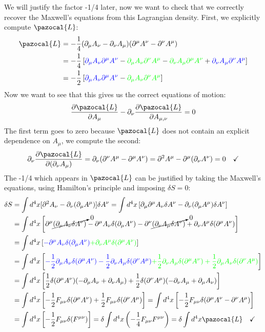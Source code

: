 \documentclass[../main.tex]{subfiles}
\begin{document}
We will justify the factor -1/4 later, now we want to check that we correctly recover the Maxwell's equations from this Lagrangian density. First, we explicitly compute $\pazocal{L}$:
\begin{align*}
\pazocal{L}&=-\frac{1}{4}(\partial_\mu A_\nu-\partial_\nu A_\mu)(\partial^\mu A^\nu-\partial^\nu A^\mu)\\
&=-\frac{1}{4}\left[{\color{blue}\partial_\mu A_\nu\partial^\mu A^\nu}-{\color{green}\partial_\mu A_\nu\partial^\nu A^\mu}-{\color{green}\partial_\nu A_\mu\partial^\mu A^\nu}+{\color{blue}\partial_\nu A_\mu\partial^\nu A^\mu}\right]\\
&=-\frac{1}{2}\left[{\color{blue}\partial_\mu A_\nu \partial^\mu A^\nu}-{\color{green}\partial_\mu A_\nu\partial^\nu A^\mu}\right]
\end{align*}
Now we want to see that this gives us the correct equations of motion:
\[
\frac{\partial\pazocal{L}}{\partial A_\mu}-\partial_\nu\frac{\partial\pazocal{L}}{\partial A_{\mu,\nu}}=0
\]
The first term goes to zero because $\pazocal{L}$ does not contain an explicit dependence on $A_\mu$, we compute the second:
\[
\partial_\nu\frac{\partial\pazocal{L}}{\partial(\partial_\nu A_\mu)}=\partial_\nu(\partial^\nu A^\mu-\partial^\mu A^\nu)=\partial^2 A^\mu-\partial^\mu(\partial_\nu A^\nu)=0 \quad \checkmark
\]
The -1/4 which appears in $\pazocal{L}$ can be justified by taking the Maxwell's equations, using Hamilton's principle and imposing $\delta S=0$:
\begin{align*}
\delta S&=\int d^4x[\partial^2 A_\nu-\partial_\nu(\partial_\mu A^\mu)]\delta A^\nu=\int d^4x \left[\partial_\mu\partial^\mu A_\nu\delta A^\nu-\partial_\nu(\partial_\mu A^\mu)\delta A^\nu\right]\\
&=\int d^4x \left[\partial^\mu\cancelto{0}{(\partial_\mu A_\nu \delta A^\nu)}-\partial^\mu A_\nu \delta(\partial_\mu A^\nu)-\partial^\nu\cancelto{0}{(\partial_\nu A_\mu\delta A^\nu)}+\partial_\nu A^\mu\delta(\partial^\mu A^\nu)\right]\\
&=\int d^4x \left[{\color{blue}-\partial^\mu A_\nu \delta(\partial_\mu A^\nu)}{\color{green}+\partial_\nu A^\mu\delta(\partial^\mu A^\nu)}\right]\\
&=\int d^4x \left[{\color{blue}-\frac{1}{2}\partial_\mu A_\nu\delta(\partial^\mu A^\nu)-\frac{1}{2}\partial_\nu A_\mu\delta(\partial^\nu A^\mu)}{\color{green}+\frac{1}{2}\partial_\nu A_\mu\delta(\partial^\mu A^\nu)+\frac{1}{2}\partial_\mu A_\nu\delta(\partial^\nu A^\mu)}\right]\\
&=\int d^4x\left[\frac{1}{2}\delta(\partial^\mu A^\nu)(-\partial_\mu A_\nu+\partial_\nu A_\mu)+\frac{1}{2}\delta(\partial^\nu A^\mu)(-\partial_\nu A_\mu+\partial_\mu A_\nu)\right]\\
&=\int d^4x\left[-\frac{1}{2}F_{\mu\nu}\delta(\partial^\mu A^\nu)+\frac{1}{2}F_{\mu\nu}\delta(\partial^\nu A^\mu)\right]=\int d^4x\left[-\frac{1}{2}F_{\mu\nu}\delta(\partial^\mu A^\nu-\partial^\nu A^\mu)\right]\\
&=\int d^4x \left[-\frac{1}{2}F_{\mu\nu}\delta(F^{\mu\nu})\right]=\delta\int d^4x\left(-\frac{1}{4}F_{\mu\nu}F^{\mu\nu}\right)=\delta\int d^4x\pazocal{L} \quad \checkmark
\end{align*}
\end{document}
